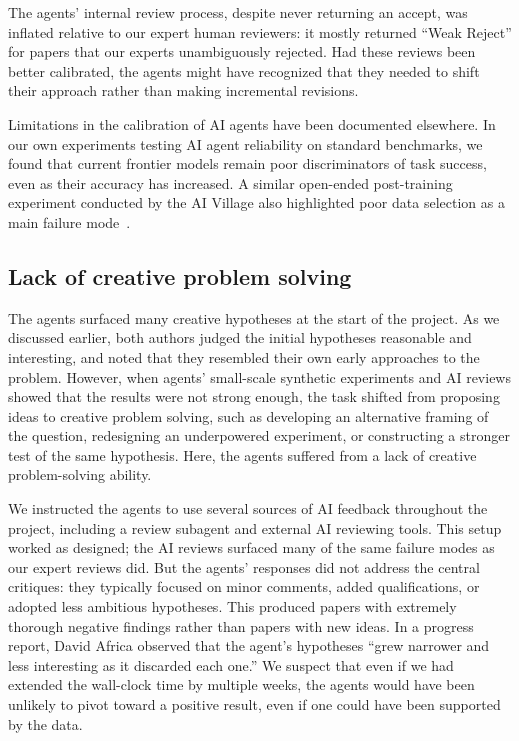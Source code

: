 The agents' internal review process, despite never returning an accept, was
inflated relative to our expert human reviewers: it mostly returned ``Weak
Reject'' for papers that our experts unambiguously rejected. Had these reviews
been better calibrated, the agents might have recognized that they needed to
shift their approach rather than making incremental revisions.

Limitations in the calibration of AI agents have been documented elsewhere.
In our own experiments testing AI agent reliability on standard benchmarks,
we found that current frontier models remain poor discriminators of task
success, even as their accuracy has increased. A similar open-ended
post-training experiment conducted by the AI Village also highlighted poor
data selection as a main failure mode~\citep{tekofsky2026finetuneleader}.


\subsection{Lack of creative problem solving}

The agents surfaced many creative hypotheses at the start of the project. As
we discussed earlier, both authors judged the initial hypotheses reasonable
and interesting, and noted that they resembled their own early approaches to
the problem. However, when agents' small-scale synthetic experiments and AI
reviews showed that the results were not strong enough, the task shifted from
proposing ideas to creative problem solving, such as developing an alternative framing of the question, redesigning an underpowered experiment, or constructing a stronger test of the same hypothesis. Here, the agents suffered from a lack of creative problem-solving ability.

We instructed the agents to use several sources of AI feedback throughout the
project, including a review subagent and external AI reviewing tools. This
setup worked as designed; the AI reviews surfaced many of the same failure
modes as our expert reviews did. But the agents' responses did not address the central critiques: they typically focused on minor comments, added qualifications, or adopted less ambitious hypotheses. This produced papers with
extremely thorough negative findings rather than papers with new ideas. In a
progress report, David Africa observed that the agent's hypotheses ``grew
narrower and less interesting as it discarded each one.'' We suspect that even
if we had extended the wall-clock time by multiple weeks, the agents would
have been unlikely to pivot toward a positive result, even if one could have
been supported by the data.

